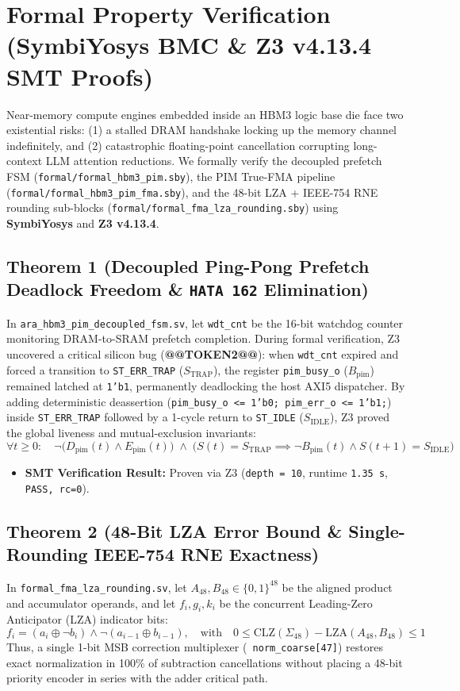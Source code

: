 \documentclass[journal,10pt,twocolumn]{IEEEtran}
\begin{document}
\section{Formal Property Verification (SymbiYosys BMC \& Z3 v4.13.4 SMT Proofs)}

Near-memory compute engines embedded inside an HBM3 logic base die face two existential risks: (1) a stalled DRAM handshake locking up the memory channel indefinitely, and (2) catastrophic floating-point cancellation corrupting long-context LLM attention reductions. We formally verify the decoupled prefetch FSM (\texttt{formal/formal\_hbm3\_pim.sby}), the PIM True-FMA pipeline (\texttt{formal/formal\_hbm3\_pim\_fma.sby}), and the 48-bit LZA + IEEE-754 RNE rounding sub-blocks (\texttt{formal/formal\_fma\_lza\_rounding.sby}) using \textbf{SymbiYosys} and \textbf{Z3 v4.13.4}.

\subsection{Theorem 1 (Decoupled Ping-Pong Prefetch Deadlock Freedom \& \texttt{HATA 162} Elimination)}
In \texttt{ara\_hbm3\_pim\_decoupled\_fsm.sv}, let \texttt{wdt\_cnt} be the 16-bit watchdog counter monitoring DRAM-to-SRAM prefetch completion. During formal verification, Z3 uncovered a critical silicon bug (\textbf{@@TOKEN2@@}): when \texttt{wdt\_cnt} expired and forced a transition to \texttt{ST\_ERR\_TRAP} ($S_{\mathrm{TRAP}}$), the register \texttt{pim\_busy\_o} ($B_{\mathrm{pim}}$) remained latched at \texttt{1'b1}, permanently deadlocking the host AXI5 dispatcher.
By adding deterministic deassertion (\texttt{pim\_busy\_o <= 1'b0; pim\_err\_o <= 1'b1;}) inside \texttt{ST\_ERR\_TRAP} followed by a 1-cycle return to \texttt{ST\_IDLE} ($S_{\mathrm{IDLE}}$), Z3 proved the global liveness and mutual-exclusion invariants:
$$\forall t \ge 0:\quad \neg\big(D_{\mathrm{pim}}(t) \wedge E_{\mathrm{pim}}(t)\big) \;\wedge\; \Big(S(t) = S_{\mathrm{TRAP}} \implies \neg B_{\mathrm{pim}}(t) \wedge S(t+1) = S_{\mathrm{IDLE}}\Big)$$

\begin{itemize}
  \item \textbf{SMT Verification Result:} Proven via Z3 (\texttt{depth = 10}, runtime \texttt{1.35 s}, \texttt{PASS, rc=0}).
\end{itemize}

\subsection{Theorem 2 (48-Bit LZA Error Bound \& Single-Rounding IEEE-754 RNE Exactness)}
In \texttt{formal\_fma\_lza\_rounding.sv}, let $A_{48}, B_{48} \in \{0,1\}^{48}$ be the aligned product and accumulator operands, and let $f_i, g_i, k_i$ be the concurrent Leading-Zero Anticipator (LZA) indicator bits:
$$f_i = (a_i \oplus \neg b_i) \wedge \neg(a_{i-1} \oplus b_{i-1}),\quad \text{with}\quad 0 \le \mathrm{CLZ}(\Sigma_{48}) - \mathrm{LZA}(A_{48}, B_{48}) \le 1$$
Thus, a single 1-bit MSB correction multiplexer (\texttt{~norm\_coarse[47]}) restores exact normalization in 100\% of subtraction cancellations without placing a 48-bit priority encoder in series with the adder critical path.
\end{document}
